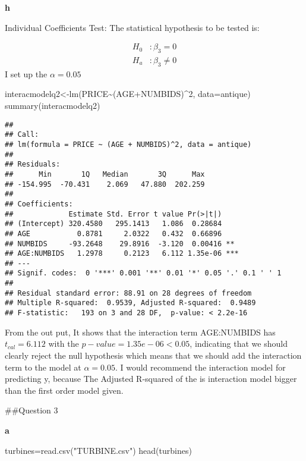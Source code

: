 \documentclass[
]{article}
\newenvironment{Shaded}{\begin{snugshade}}{\end{snugshade}}
\newcommand{\AttributeTok}[1]{\textcolor[rgb]{0.77,0.63,0.00}{#1}}
\newcommand{\DecValTok}[1]{\textcolor[rgb]{0.00,0.00,0.81}{#1}}
\newcommand{\FunctionTok}[1]{\textcolor[rgb]{0.00,0.00,0.00}{#1}}
\newcommand{\NormalTok}[1]{#1}
\newcommand{\OtherTok}[1]{\textcolor[rgb]{0.56,0.35,0.01}{#1}}
\newcommand{\SpecialCharTok}[1]{\textcolor[rgb]{0.00,0.00,0.00}{#1}}
\newcommand{\StringTok}[1]{\textcolor[rgb]{0.31,0.60,0.02}{#1}}
\begin{document}
\textbf{h}

Individual Coefficients Test: The statistical hypothesis to be tested
is:

\[
\begin{aligned}
H_0&:\beta_3=0\\
H_a&:\beta_3\neq0
\end{aligned}
\] I set up the \(\alpha = 0.05\)

\begin{Shaded}
\begin{Highlighting}[]
\NormalTok{interacmodelq2}\OtherTok{\textless{}{-}}\FunctionTok{lm}\NormalTok{(PRICE}\SpecialCharTok{\textasciitilde{}}\NormalTok{(AGE}\SpecialCharTok{+}\NormalTok{NUMBIDS)}\SpecialCharTok{\^{}}\DecValTok{2}\NormalTok{, }\AttributeTok{data=}\NormalTok{antique)}
\FunctionTok{summary}\NormalTok{(interacmodelq2)}
\end{Highlighting}
\end{Shaded}

\begin{verbatim}
## 
## Call:
## lm(formula = PRICE ~ (AGE + NUMBIDS)^2, data = antique)
## 
## Residuals:
##      Min       1Q   Median       3Q      Max 
## -154.995  -70.431    2.069   47.880  202.259 
## 
## Coefficients:
##             Estimate Std. Error t value Pr(>|t|)    
## (Intercept) 320.4580   295.1413   1.086  0.28684    
## AGE           0.8781     2.0322   0.432  0.66896    
## NUMBIDS     -93.2648    29.8916  -3.120  0.00416 ** 
## AGE:NUMBIDS   1.2978     0.2123   6.112 1.35e-06 ***
## ---
## Signif. codes:  0 '***' 0.001 '**' 0.01 '*' 0.05 '.' 0.1 ' ' 1
## 
## Residual standard error: 88.91 on 28 degrees of freedom
## Multiple R-squared:  0.9539, Adjusted R-squared:  0.9489 
## F-statistic:   193 on 3 and 28 DF,  p-value: < 2.2e-16
\end{verbatim}

From the out put, It shows that the interaction term AGE:NUMBIDS has
\(t_{cal}=6.112\) with the \(p-value= 1.35e-06 < 0.05\), indicating that
we should clearly reject the null hypothesis which means that we should
add the interaction term to the model at \(α=0.05\). I would recommend
the interaction model for predicting y, because The Adjusted R-squared
of the is interaction model bigger than the first order model given.

\#\#Question 3

\textbf{a}

\begin{Shaded}
\begin{Highlighting}[]
\NormalTok{turbines}\OtherTok{=}\FunctionTok{read.csv}\NormalTok{(}\StringTok{"TURBINE.csv"}\NormalTok{)}
\FunctionTok{head}\NormalTok{(turbines)}
\end{Highlighting}
\end{Shaded}
\end{document}
